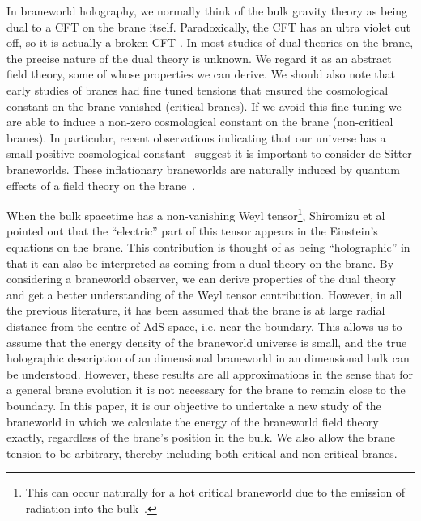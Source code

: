 \documentclass[a4paper,12pt]{article}
\begin{document}
In braneworld holography, we normally think of the bulk gravity theory
as being dual to a CFT on the brane itself. Paradoxically, the CFT has
an ultra violet cut off, so it is actually a broken CFT
\cite{Kraus:domainwalls,Gubser:gravity}. In most studies of dual
theories on the brane, the precise nature of the dual theory is
unknown. We regard it as an abstract field theory, some of whose
properties we can derive. We should also note that early studies of
branes \cite{Randall:compactification} had fine tuned tensions that
ensured the cosmological constant on the brane vanished (critical
branes). If we avoid this fine tuning we are able to induce a non-zero
cosmological constant on the brane \cite{Karch:local} (non-critical
branes). In particular, recent observations indicating that our
universe has a small positive cosmological constant~\cite{Riess:astro,
Perlmutter:astro} suggest it is important to consider de Sitter
braneworlds. These inflationary braneworlds are naturally induced by
quantum effects of a field theory on the
brane~\cite{Hawking:newworld,Nojiri:inflation,Nojiri:brane}.

When the bulk spacetime has a non-vanishing Weyl tensor\footnote{This
can occur naturally for a hot critical braneworld due to the emission
of radiation into the bulk~\cite{Hebecker:rs2}.}, Shiromizu et al
\cite{Shiromizu:3brane} pointed out that the ``electric'' part of this
tensor appears in the Einstein's equations on the brane. This
contribution is thought of as being ``holographic'' in that it can
also be interpreted as coming from a dual theory on the brane. By
considering a braneworld observer, we can derive properties of the
dual theory and get a better understanding of the Weyl tensor
contribution. However, in all the previous literature, it has been
assumed that the brane is at large radial distance from the centre of
AdS space, i.e. near the boundary.  This allows us to assume that the
energy density of the braneworld universe is small, and the true
holographic description of an \coordHE{} dimensional braneworld in an \coordHE{}
dimensional bulk can be understood.  However, these results are all
approximations in the sense that for a general brane evolution it is
not necessary for the brane to remain close to the boundary.  In this
paper, it is our objective to undertake a new study of the braneworld
in which we calculate the energy of the braneworld field theory
exactly, regardless of the brane's position in the bulk. We also allow
the brane tension to be arbitrary, thereby including both critical and
non-critical branes.
\end{document}
